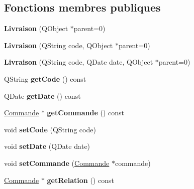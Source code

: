 \subsection*{Fonctions membres publiques}
\begin{DoxyCompactItemize}
\item 
\hypertarget{class_core_1_1_livraison_aa379bd1af2efc8ec306d6c67ee8f4261}{
{\bfseries Livraison} (QObject $\ast$parent=0)}
\label{df/d27/class_core_1_1_livraison_aa379bd1af2efc8ec306d6c67ee8f4261}

\item 
\hypertarget{class_core_1_1_livraison_a80b3e82dc3309a7a62fb3c49d13d9192}{
{\bfseries Livraison} (QString code, QObject $\ast$parent=0)}
\label{df/d27/class_core_1_1_livraison_a80b3e82dc3309a7a62fb3c49d13d9192}

\item 
\hypertarget{class_core_1_1_livraison_ad05b42ede2806b27073c8838832a07d6}{
{\bfseries Livraison} (QString code, QDate date, QObject $\ast$parent=0)}
\label{df/d27/class_core_1_1_livraison_ad05b42ede2806b27073c8838832a07d6}

\item 
\hypertarget{class_core_1_1_livraison_a94c4cb5ef6f414eea4efcad5e28b9eb0}{
QString {\bfseries getCode} () const }
\label{df/d27/class_core_1_1_livraison_a94c4cb5ef6f414eea4efcad5e28b9eb0}

\item 
\hypertarget{class_core_1_1_livraison_a1a804da6b7b0ab0e35cab544fdbe98c6}{
QDate {\bfseries getDate} () const }
\label{df/d27/class_core_1_1_livraison_a1a804da6b7b0ab0e35cab544fdbe98c6}

\item 
\hypertarget{class_core_1_1_livraison_aeb7fc3228969963e1ee963b8f3c5fd68}{
\hyperlink{class_core_1_1_commande}{Commande} $\ast$ {\bfseries getCommande} () const }
\label{df/d27/class_core_1_1_livraison_aeb7fc3228969963e1ee963b8f3c5fd68}

\item 
\hypertarget{class_core_1_1_livraison_acadeeaa69380464672ca9d570b69dc68}{
void {\bfseries setCode} (QString code)}
\label{df/d27/class_core_1_1_livraison_acadeeaa69380464672ca9d570b69dc68}

\item 
\hypertarget{class_core_1_1_livraison_ad556ab227f0a8b89065a6158384fc6f2}{
void {\bfseries setDate} (QDate date)}
\label{df/d27/class_core_1_1_livraison_ad556ab227f0a8b89065a6158384fc6f2}

\item 
\hypertarget{class_core_1_1_livraison_a300de117ed9872251c4b3a02183db114}{
void {\bfseries setCommande} (\hyperlink{class_core_1_1_commande}{Commande} $\ast$commande)}
\label{df/d27/class_core_1_1_livraison_a300de117ed9872251c4b3a02183db114}

\item 
\hypertarget{class_core_1_1_livraison_a8757eceef21d0f3edc13e2c2c11b651e}{
\hyperlink{class_core_1_1_commande}{Commande} $\ast$ {\bfseries getRelation} () const }
\label{df/d27/class_core_1_1_livraison_a8757eceef21d0f3edc13e2c2c11b651e}

\end{DoxyCompactItemize}
